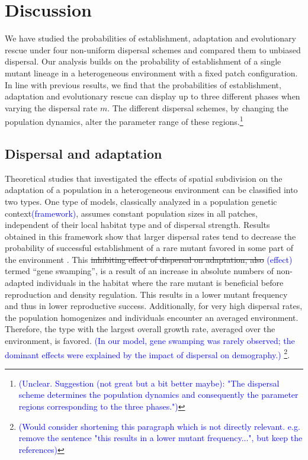 \documentclass[a4paper,11pt]{article}
\newcommand{\francois}[1]{\textcolor{blue}{(#1)}}
\newcommand{\chg}[1]{\textcolor{change}{#1}}
\begin{document}
\section*{Discussion}
%
We have studied the probabilities of establishment, adaptation and evolutionary rescue under four non-\chg{uniform} dispersal schemes and compared them to \chg{unbiased} dispersal. Our analysis builds on the probability of establishment of a single mutant lineage in a heterogeneous environment with a fixed patch configuration. In line with previous results, we find that the probabilities of establishment, adaptation and evolutionary rescue can display up to three different phases when varying the dispersal rate $m$.
The different dispersal schemes, by changing the population dynamics, \chg{alter the parameter range of these regions.}\footnote{\francois{Unclear. Suggestion (not great but a bit better maybe): "The dispersal scheme determines the population dynamics and consequently the parameter regions corresponding to the three phases."}}


\subsection*{Dispersal and adaptation}
Theoretical studies that investigated the effects of spatial subdivision on the adaptation of a population in a heterogeneous environment can be classified into two types. One type of models, classically analyzed in a population genetic context\francois{framework}, assumes constant population sizes in all patches, independent of their local habitat type and of dispersal strength. Results obtained in this framework show that larger dispersal rates tend to decrease the probability of successful establishment of a rare mutant favored in some part of the environment \citep[e.g.][]{garcia_1997}. This \st{inhibiting effect of dispersal on adaptation, also} \francois{effect} termed ``gene swamping'', is a result of an increase in absolute numbers of non-adapted individuals in the habitat where the rare mutant is beneficial \chg{before reproduction and density regulation. This results in a lower mutant frequency \citep{lenormand_2002,tomasini_2018} and thus in lower reproductive success.} Additionally, for very high dispersal rates, the population homogenizes and individuals encounter an averaged environment. Therefore, the type with the largest overall growth rate, averaged over the environment, is favored.  \francois{In our model, gene swamping was rarely observed; the dominant effects were explained by the impact of dispersal on demography.} \footnote{\francois{Would consider shortening this paragraph which is not directly relevant. e.g. remove the sentence "this results in a lower mutant frequency...", but keep the references}}.
\end{document}
